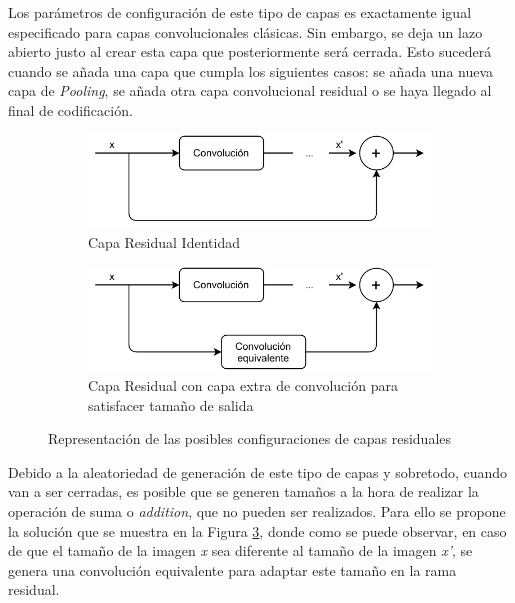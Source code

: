 \begin{itemize}
    Los parámetros de configuración de este tipo de capas es exactamente igual especificado para capas convolucionales clásicas. Sin embargo, se deja un lazo abierto justo al crear esta capa que posteriormente será cerrada. Esto sucederá cuando se añada una capa que cumpla los siguientes casos: se añada una nueva capa de \textit{Pooling}, se añada otra capa convolucional residual o se haya llegado al final de codificación.\\
    
    \begin{figure}[h]
    \centering
    \begin{subfigure}{0.8\textwidth}
        \centering
        \includegraphics[width=\textwidth]{figuras/implementacion/Skip_convolucion_Implementacion_1.pdf}
        \caption{Capa Residual Identidad}
        \label{fig:residual_identidad}
    \end{subfigure}
    \hfill
    \begin{subfigure}{0.8\textwidth}
        \centering
        \includegraphics[width=\textwidth]{figuras/implementacion/Skip_convolucion_Implementacion_2.pdf}
        \caption{Capa Residual con capa extra de convolución para satisfacer tamaño de salida}
        \label{fig:residual_conv_eq}
    \end{subfigure}
    \caption{Representación de las posibles configuraciones de capas residuales}
    \label{fig:residual}
    \end{figure}
    
    Debido a la aleatoriedad de generación de este tipo de capas y sobretodo, cuando van a ser cerradas, es posible que se generen tamaños a la hora de realizar la operación de suma o \textit{addition}, que no pueden ser realizados. Para ello se propone la solución que se muestra en la Figura \ref{fig:residual}, donde como se puede observar, en caso de que el tamaño de la imagen \textit{x} sea diferente al tamaño de la imagen \textit{x'}, se genera una convolución equivalente para adaptar este tamaño en la rama residual.
    

\end{itemize}

